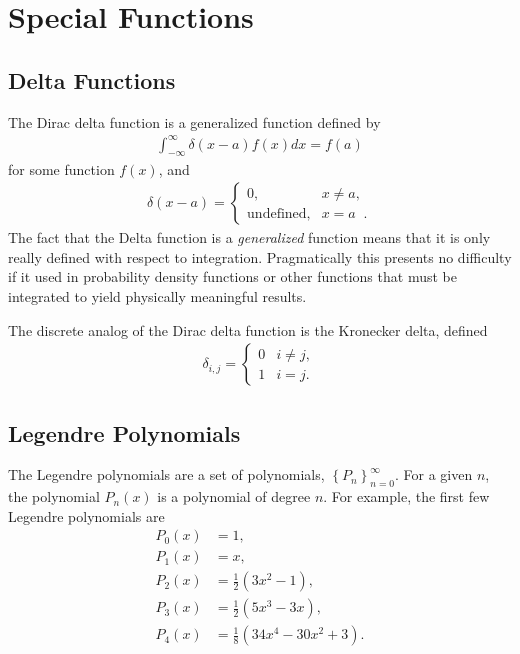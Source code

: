 \documentclass[11pt]{article}
\begin{document}
\section{Special Functions}
\label{sec:orgheadline7}
\subsection{Delta Functions}
\label{sec:orgheadline5}
The Dirac delta function is a generalized function defined by
\begin{align}
  \int_{-\infty}^\infty \delta(x-a) f(x) dx = f(a)
\end{align}
for some function \(f(x)\), and
\begin{align}
  \delta(x-a) = 
  \begin{cases}
    0, & x\neq a, \\
    \text{undefined}, & x=a \;\;.
  \end{cases}
\end{align}
The fact that the Delta function is a \emph{generalized} function means that it is only really defined with respect to integration.  Pragmatically this presents no difficulty if it used in probability density functions or other functions that must be integrated to yield physically meaningful results.

The discrete analog of the Dirac delta function is the Kronecker delta, defined
\begin{align}
  \delta_{i,j} = 
  \begin{cases}
    0 & i \neq j, \\
    1 & i = j.
  \end{cases}
\end{align}
\subsection{Legendre Polynomials}
\label{sec:orgheadline6}
The Legendre polynomials are a set of polynomials, \(\left\{ P_n \right\}_{n=0}^\infty\).  For a given \(n\), the polynomial \(P_n(x)\) is a polynomial of degree \(n\).  For example, the first few Legendre polynomials are
\begin{align*}
  P_0(x) &= 1, \\
  P_1(x) &= x, \\
  P_2(x) &= \frac{1}{2}\left(3 x^2 - 1 \right), \\
  P_3(x) &= \frac{1}{2}\left(5 x^3 - 3 x \right), \\
  P_4(x) &= \frac{1}{8}\left(34 x^4 - 30 x^2 + 3 \right).
\end{align*}
\end{document}
